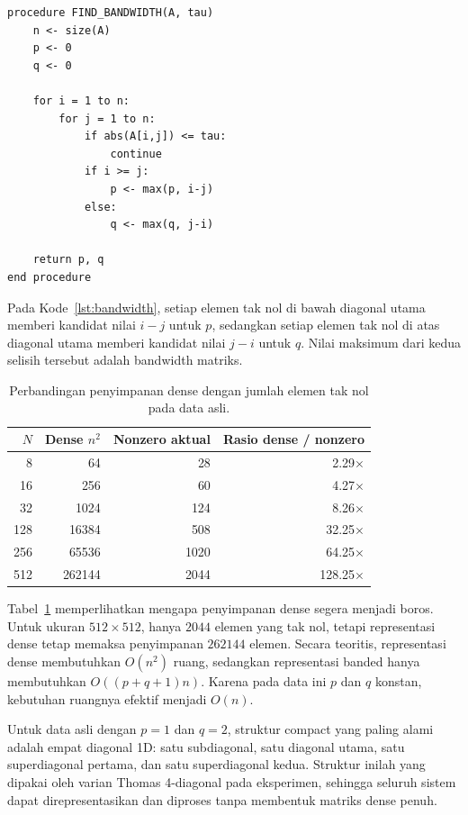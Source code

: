 \documentclass[12pt,a4paper]{article}
\begin{document}
\begin{lstlisting}[style=pseudo,caption={Pseudocode pencarian lower bandwidth $p$ dan upper bandwidth $q$.},label={lst:bandwidth}]
procedure FIND_BANDWIDTH(A, tau)
    n <- size(A)
    p <- 0
    q <- 0

    for i = 1 to n:
        for j = 1 to n:
            if abs(A[i,j]) <= tau:
                continue
            if i >= j:
                p <- max(p, i-j)
            else:
                q <- max(q, j-i)

    return p, q
end procedure
\end{lstlisting}

Pada Kode~\ref{lst:bandwidth}, setiap elemen tak nol di bawah diagonal utama memberi kandidat nilai $i-j$ untuk $p$, sedangkan setiap elemen tak nol di atas diagonal utama memberi kandidat nilai $j-i$ untuk $q$. Nilai maksimum dari kedua selisih tersebut adalah bandwidth matriks.

\begin{table}[h]
\centering
\caption{Perbandingan penyimpanan dense dengan jumlah elemen tak nol pada data asli.}
\label{tab:bandwidth-storage}
\begin{tabular}{rrrr}
\toprule
$N$ & Dense $n^2$ & Nonzero aktual & Rasio dense / nonzero \\
\midrule
8   & 64     & 28   & 2.29$\times$ \\
16  & 256    & 60   & 4.27$\times$ \\
32  & 1024   & 124  & 8.26$\times$ \\
128 & 16384  & 508  & 32.25$\times$ \\
256 & 65536  & 1020 & 64.25$\times$ \\
512 & 262144 & 2044 & 128.25$\times$ \\
\bottomrule
\end{tabular}
\end{table}

Tabel~\ref{tab:bandwidth-storage} memperlihatkan mengapa penyimpanan dense segera menjadi boros. Untuk ukuran $512\times512$, hanya $2044$ elemen yang tak nol, tetapi representasi dense tetap memaksa penyimpanan $262144$ elemen. Secara teoritis, representasi dense membutuhkan $O(n^2)$ ruang, sedangkan representasi banded hanya membutuhkan $O((p+q+1)n)$. Karena pada data ini $p$ dan $q$ konstan, kebutuhan ruangnya efektif menjadi \textbf{$O(n)$}.

Untuk data asli dengan $p=1$ dan $q=2$, struktur compact yang paling alami adalah empat diagonal 1D: satu subdiagonal, satu diagonal utama, satu superdiagonal pertama, dan satu superdiagonal kedua. Struktur inilah yang dipakai oleh varian Thomas 4-diagonal pada eksperimen, sehingga seluruh sistem dapat direpresentasikan dan diproses tanpa membentuk matriks dense penuh.
\end{document}
